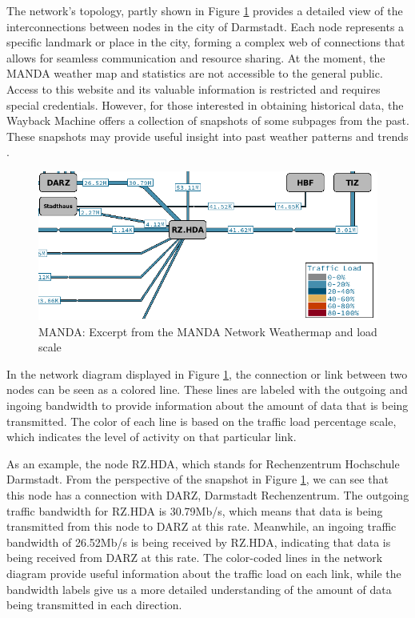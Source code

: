 \documentclass[sigconf,authorversion,nonacm]{acmart}
\begin{document}
The network's topology, partly shown in Figure \ref{MANDA: MANDA Network Weathermap} provides a detailed view of the interconnections between nodes in the city of Darmstadt. Each node represents a specific landmark or place in the city, forming a complex web of connections that allows for seamless communication and resource sharing. At the moment, the MANDA weather map and statistics are not accessible to the general public. Access to this website and its valuable information is restricted and requires special credentials. However, for those interested in obtaining historical data, the Wayback Machine offers a collection of snapshots of some subpages from the past. These snapshots may provide useful insight into past weather patterns and trends \cite{gartner}.

\begin{figure}
    \centering
    \includegraphics[width=\linewidth]{MANDA/manda.png}
    \caption{MANDA: Excerpt from the MANDA Network Weathermap and load scale}
    \label{MANDA: MANDA Network Weathermap}
\end{figure}

In the network diagram displayed in Figure \ref{MANDA: MANDA Network Weathermap}, the connection or link between two nodes can be seen as a colored line. These lines are labeled with the outgoing and ingoing bandwidth to provide information about the amount of data that is being transmitted. The color of each line is based on the traffic load percentage scale, which indicates the level of activity on that particular link. 

As an example, the node RZ.HDA, which stands for Rechenzentrum Hochschule Darmstadt. From the perspective of the snapshot in Figure \ref{MANDA: MANDA Network Weathermap}, we can see that this node has a connection with DARZ, Darmstadt Rechenzentrum. The outgoing traffic bandwidth for RZ.HDA is 30.79Mb/s, which means that data is being transmitted from this node to DARZ at this rate. Meanwhile, an ingoing traffic bandwidth of 26.52Mb/s is being received by RZ.HDA, indicating that data is being received from DARZ at this rate. The color-coded lines in the network diagram provide useful information about the traffic load on each link, while the bandwidth labels give us a more detailed understanding of the amount of data being transmitted in each direction.
\end{document}
